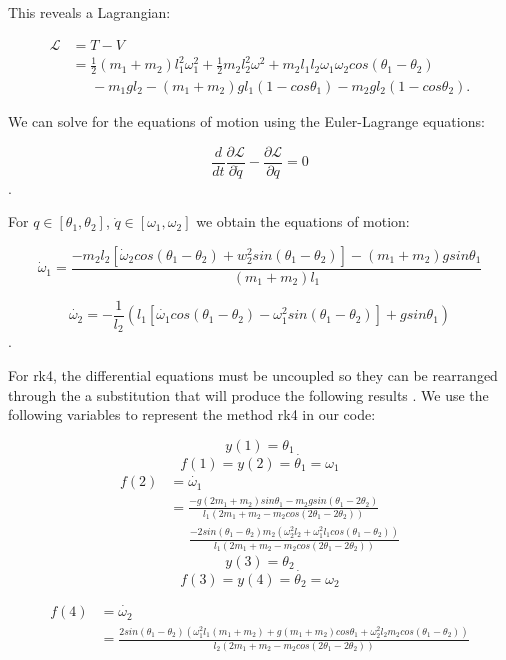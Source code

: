 \documentclass[12pt]{article}
\begin{document}
This reveals a Lagrangian:

\begin{align*}
    \mathcal{L} &= T - V\\
      &= \frac{1}{2} (m_1 + m_2) l_1^2 \omega_1^2 + \frac{1}{2} m_2 l_2^2 \omega^2 + m_2 l_1 l_2 \omega_1 \omega_2 cos (\theta_1 - \theta_2)\\ 
      &\;\;\;\;\;- m_1 g l_2 - (m_1 + m_2) g l_1 (1 - cos \theta_1) - m_2 g l_2 (1 - cos \theta_2).
\end{align*}

We can solve for the equations of motion using the Euler-Lagrange equations:

\[\frac{d}{dt} \frac{\partial \mathcal{L}}{\partial \dot{q}} - \frac{\partial \mathcal{L}}{\partial q} = 0\].

For $q \in [\theta_1,\theta_2]$, $\dot{q} \in [\omega_1, \omega_2]$ we obtain the equations of motion:

\[\dot{\omega}_1 = \frac{-m_2 l_2 [\dot{\omega}_2 cos(\theta_1 - \theta_2) + w_2^2 sin(\theta_1 - \theta_2)] - (m_1 + m_2) g sin \theta_1}{(m_1+m_2)l_1}\]

\[\dot{\omega_2} = - \frac{1}{l_2} (l_1[\dot{\omega_1} cos(\theta_1 - \theta_2) - \omega_1^2 sin(\theta_1 - \theta_2)] + g sin \theta_1)\].

For rk4, the differential equations must be uncoupled so they can be rearranged through the a substitution that will produce the following results \cite{neumann}.  We use the following variables to represent the method rk4 in our code:

\[y(1) = \theta_1\]
\[f(1) = y(2) = \dot{\theta_1} = \omega_1\]
\begin{align*}
    f(2) &= \dot{\omega_1} \\
    &= \frac{-g(2m_1+m_2)sin\theta_1-m_2gsin(\theta_1-2\theta_2)}{l_1(2m_1+m_2-m_2cos(2\theta_1-2\theta_2))} \\
    &\;\;\;\;\;\frac{-2sin(\theta_1-\theta_2)m_2(\omega_2^2l_2+\omega_1^2l_1cos(\theta_1-\theta_2))}{l_1(2m_1+m_2-m_2cos(2\theta_1-2\theta_2))}
\end{align*}
\[y(3) = \theta_2\]
\[f(3) = y(4) = \dot{\theta_2} = \omega_2\]
\begin{small}
\begin{align*}
    f(4) &= \dot{\omega_2} \\
    &= \frac{2sin(\theta_1-\theta_2)(\omega_1^2l_1(m_1+m_2)+g(m_1+m_2)cos\theta_1+\omega_2^2l_2m_2cos(\theta_1-\theta_2))}{l_2(2m_1+m_2-m_2cos(2\theta_1-2\theta_2))}
\end{align*}
\end{small}
\end{document}

